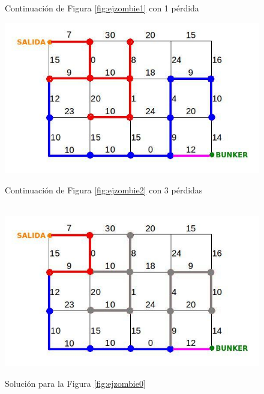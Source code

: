 \begin{figure}[!htb]
  \caption{Continuación de Figura \ref{fig:ejzombie1} con 1 pérdida}\label{fig:ejzombie2}
\endminipage
{}
  \includegraphics[scale=0.5]{imagenes/ejzombie3.jpeg}
  \caption{Continuación de Figura \ref{fig:ejzombie2} con 3 pérdidas}\label{fig:ejzombie3}
\endminipage\\
  \includegraphics[scale=0.5]{imagenes/ejzombie4.jpeg}
  \caption{Solución para la Figura \ref{fig:ejzombie0}}\label{fig:ejzombie4}
\endminipage
\end{figure}


\vspace*{0.6cm}





